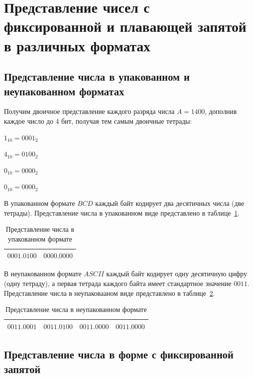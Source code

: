\section{Представление чисел с фиксированной и плавающей запятой в различных форматах}

\subsection{Представление числа в упакованном и неупакованном форматах}
Получим двоичное представление каждого разряда числа $A = 1400$, дополнив каждое число до 4 бит,
получая тем самым двоичные тетрады:

$1_{10} = 0001_{2}$

$4_{10} = 0100_{2}$

$0_{10} = 0000_{2}$

$0_{10} = 0000_{2}$

В упакованном формате $BCD$ каждый байт кодирует два десятичных числа (две тетрады).
Представление числа в упакованном виде представлено в таблице~\ref{tab:a-in-bcd}.

\begin{table}[H]
    \centering
    \caption{Представление числа в упакованном формате}
    \label{tab:a-in-bcd}
    \begin{tabular}{|c|c|}
        \hline
		$0001.0100$ & $0000.0000$ \\
		\hline
    \end{tabular}
\end{table}

В неупакованном формате $ASCII$ каждый байт кодирует одну десятичную цифру (одну тетраду),
а первая тетрада каждого байта имеет стандартное значение $0011$.
Представление числа в неупаковааном виде представлено в таблице~\ref{tab:a-in-ascii}.

\begin{table}[H]
    \centering
    \caption{Представление числа в неупакованном формате}
    \label{tab:a-in-ascii}
    \begin{tabular}{|c|c|c|c|}
        \hline
		$0011.0001$ & $0011.0100$ & $0011.0000$ & $0011.0000$\\
		\hline
    \end{tabular}
\end{table}

\subsection{Представление числа в форме с фиксированной запятой}

